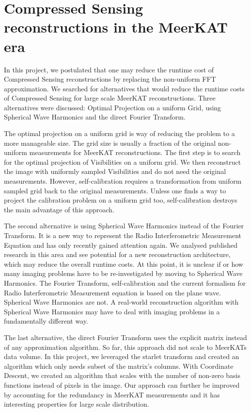 \section{Compressed Sensing reconstructions in the MeerKAT era}
In this project, we postulated that one may reduce the runtime cost of Compressed Sensing reconstructions by replacing the non-uniform FFT approximation. We searched for alternatives that would reduce the runtime costs of Compressed Sensing for large scale MeerKAT reconstructions. Three alternatives were discussed: Optimal Projection on a uniform Grid, using Spherical Wave Harmonics and the direct Fourier Transform.

The optimal projection on a uniform grid is way of reducing the problem to a more manageable size. The grid size is usually a fraction of the original non-uniform measurements for MeerKAT reconstructions. The first step is to search for the optimal projection of Visibilities on a uniform grid. We then reconstruct the image with uniformly sampled Visibilities and do not need the original measurements. However, self-calibration requires a transformation from uniform sampled grid back to the original measurements. Unless one finds a way to project the calibration problem on a uniform grid too, self-calibration destroys the main advantage of this approach.

The second alternative is using Spherical Wave Harmonics instead of the Fourier Transform. It is a new way to represent the Radio Interferometric Measurement Equation and has only recently gained attention again. We analysed published research in this area\cite{carozzi2015imaging, mcewen2008simulating} and see potential for a new reconstruction architecture, which may reduce the overall runtime costs. At this point, it is unclear if or how many imaging problems have to be re-investigated by moving to Spherical Wave Harmonics. The Fourier Transform, self-calibration and the current formalism for Radio Interferometric Measurement equation is based on the plane wave\cite{smirnov2011revisiting}. Spherical Wave Harmonics are not. A real-world reconstruction algorithm with Spherical Wave Harmonics may have to deal with imaging problems in a fundamentally different way.

The last alternative, the direct Fourier Transform uses the explicit matrix instead of any approximation algorithm. So far, this approach did not scale to MeerKATs data volume. In this project, we leveraged the starlet transform and created an algorithm which only needs subset of the matrix's columns. With Coordinate Descent, we created an algorithm that scales with the number of non-zero basis functions instead of pixels in the image. Our approach can further be improved by accounting for the redundancy in MeerKAT measurements and it has interesting properties for large scale distribution. 


